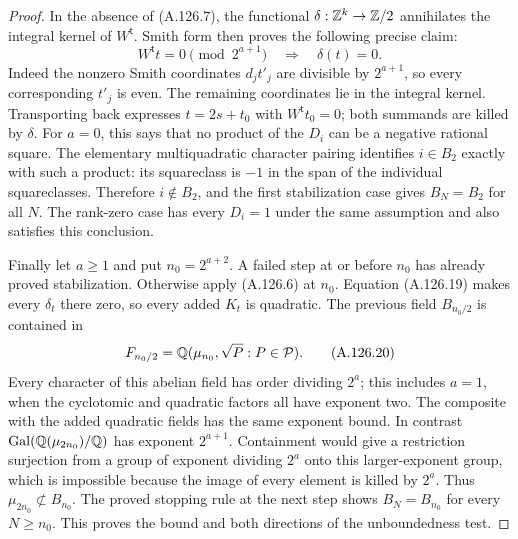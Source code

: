 \begin{proof}
In the absence of (A.126.7), the functional
$\delta:\mathbb Z^k\to\mathbb Z/2$ annihilates the integral
kernel of $W^{\mathsf t}$.
Smith form then proves the following precise claim:
\[
 W^{\mathsf t}t=0\pmod{2^{a+1}}
                         \quad\Longrightarrow\quad\delta(t)=0.
\tag{A.126.19}
\]
Indeed the nonzero Smith coordinates $d_jt'_j$
are divisible by $2^{a+1}$, so every corresponding
$t'_j$ is even.  The remaining coordinates lie
in the integral kernel.  Transporting back expresses
$t=2s+t_0$ with $W^{\mathsf t}t_0=0$; both summands
are killed by $\delta$.
For $a=0$, this says that no product of the $D_i$
can be a negative rational square.  The elementary
multiquadratic character pairing identifies
$i\in B_2$ exactly with such a product: its
squareclass is $-1$ in the span of the individual
squareclasses.  Therefore $i\notin B_2$, and the
first stabilization case gives $B_N=B_2$ for all $N$.
The rank-zero case has every $D_i=1$ under the
same assumption and also satisfies this conclusion.

Finally let $a\ge1$ and put $n_0=2^{a+2}$.
A failed step at or before $n_0$ has already proved stabilization.
Otherwise apply (A.126.6) at $n_0$.
Equation (A.126.19) makes every $\delta_t$ there zero,
so every added $K_t$ is quadratic.
The previous field $B_{n_0/2}$ is contained in
\[
                F_{n_0/2}=\mathbb Q(\mu_{n_0},\sqrt P:P\in\mathcal P).
\tag{A.126.20}
\]
Every character of this abelian field has order
dividing $2^a$; this includes $a=1$, when the
cyclotomic and quadratic factors all have exponent two.
The composite with the added quadratic fields has
the same exponent bound.
In contrast $\operatorname{Gal}(\mathbb Q(\mu_{2n_0})/\mathbb Q)$
has exponent $2^{a+1}$.
Containment would give a restriction surjection
from a group of exponent dividing $2^a$ onto this
larger-exponent group, which is impossible because
the image of every element is killed by $2^a$.
Thus $\mu_{2n_0}\not\subset B_{n_0}$.
The proved stopping rule at the next step shows
$B_N=B_{n_0}$ for every $N\ge n_0$.
This proves the bound and both directions of the
unboundedness test.


\end{proof}
